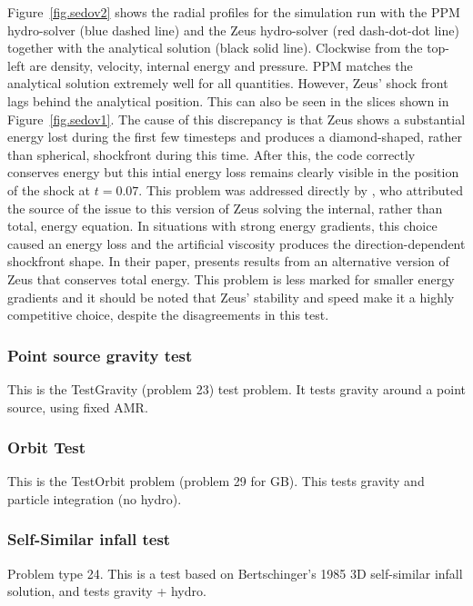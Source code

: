 Figure~\ref{fig.sedov2} shows the radial profiles for the simulation run with the PPM hydro-solver (blue dashed line) and the Zeus hydro-solver (red dash-dot-dot line) together with the analytical solution (black solid line). Clockwise from the top-left are density, velocity, internal energy and pressure. PPM matches the analytical solution extremely well for all quantities. However, Zeus' shock front lags behind the analytical position. This can also be seen in the slices shown in Figure~\ref{fig.sedov1}. The cause of this discrepancy is that Zeus shows a substantial energy lost during the first few timesteps and produces a diamond-shaped, rather than spherical, shockfront during this time. After this, the code correctly conserves energy but this intial energy loss remains clearly visible in the position of the shock at $t = 0.07$. This problem was addressed directly by \citet{Clarke2010}, who attributed the source of the issue to this version of Zeus solving the internal, rather than total, energy equation. In situations with strong energy gradients, this choice caused an energy loss and the artificial viscosity produces the direction-dependent shockfront shape. In their paper, \citet{Clarke2010} presents results from an alternative version of Zeus that conserves total energy. This problem is less marked for smaller energy gradients and it should be noted that Zeus' stability and speed make it a highly competitive choice, despite the disagreements in this test. 


\subsubsection{Point source gravity test}
\label{sec.test.gravitypointsource}
This is the TestGravity (problem 23) test problem.  It tests gravity around a point source, using fixed AMR.

\subsubsection{Orbit Test}
\label{sec.test.testorbit}
This is the TestOrbit problem (problem 29 for GB).  This tests gravity and particle integration (no hydro).

\subsubsection{Self-Similar infall test}
\label{sec.tests.infall}
Problem type 24.  This is a test based on Bertschinger's 1985 3D self-similar infall
solution, and tests gravity + hydro.

